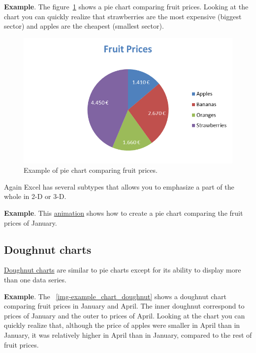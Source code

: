 \textbf{Example}. The figure~\ref{img-example_chart_pie} shows a pie chart comparing fruit prices. Looking at the chart you can
quickly realize that strawberries are the most expensive (biggest sector) and apples are the cheapest (smallest sector).

\begin{figure}[htbp]
\begin{center}
\includegraphics[scale=0.7]{../img/example_chart_pie.png}
\end{center}
\caption{Example of pie chart comparing fruit prices.}
\label{img-example_chart_pie}
\end{figure}

Again Excel has several subtypes that allows you to emphasize a part of the whole in 2-D or 3-D.

\textbf{Example}. This \href{http://aprendeconalf.es/office/excel/manual/img/example_chart_pie.gif}{animation} shows how to create a pie chart comparing the fruit prices of January.

\subsection{Doughnut charts}\hypertarget{doughnut-charts}{}\label{doughnut-charts}

\href{https://en.wikipedia.org/wiki/Pie\_chart\#Doughnut\_chart}{Doughnut charts} are similar to pie charts except for its ability to display more than one data series.

\textbf{Example}. The ~\ref{img-example_chart_doughnut} shows a doughnut chart comparing fruit prices in January and April. The inner
doughnut correspond to prices of January and the outer to prices of April. Looking at the chart you can quickly realize that, although the price of apples were smaller in April than in January, it was relatively higher in April than in January, compared to the rest of fruit prices.

